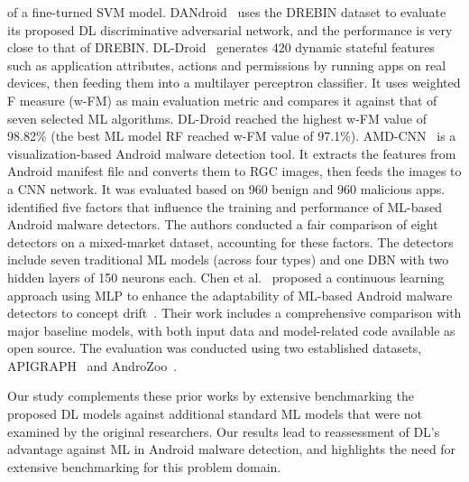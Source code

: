 of a fine-turned SVM model.  DANdroid~\cite{Millar:CODASPY20} uses the
DREBIN dataset to evaluate its proposed DL discriminative adversarial network,
and the performance is very close to that of DREBIN.
DL-Droid~\cite{Alzaylaee:Computer&security20} generates 420 dynamic
stateful features such as application attributes, actions and
permissions by running apps on real devices, then feeding them into a
multilayer perceptron classifier. It uses weighted F measure (w-FM) as
main evaluation metric and compares it against that of seven selected ML
algorithms. DL-Droid reached the highest w-FM value of 98.82\% (the best
ML model RF reached w-FM value of
97.1\%). AMD-CNN~\cite{Arslan:CCPE22} is a visualization-based Android
malware detection tool. It extracts the features from Android manifest
file and converts them to RGC images, then feeds the images to a CNN
network. It was evaluated based on 960 benign and 960 malicious
apps. \cite{Molina:computersecurity23} identified five factors that
influence the training and performance of ML-based Android malware
detectors. The authors conducted a fair comparison of eight detectors
on a mixed-market dataset, accounting for these factors. The detectors
include seven traditional ML models (across four types) and one DBN
with two hidden layers of 150 neurons each. Chen et
al.~\cite{Chen:USENIX23} proposed a continuous learning approach using
MLP to enhance the adaptability of ML-based Android malware detectors
to concept drift~\cite{Jordaney:USENIX17}. Their work includes a
comprehensive comparison with major baseline models, with both input
data and model-related code available as open source. The evaluation
was conducted using two established datasets,
APIGRAPH~\cite{Zhang:CCS20} and AndroZoo~\cite{Allix:MSR16}.

Our study complements these prior works by extensive benchmarking the proposed DL models against
additional standard ML models that were not examined by the original researchers. Our results lead
to reassessment of DL's advantage against ML in Android malware detection, and highlights the need
for extensive benchmarking for this problem domain.




